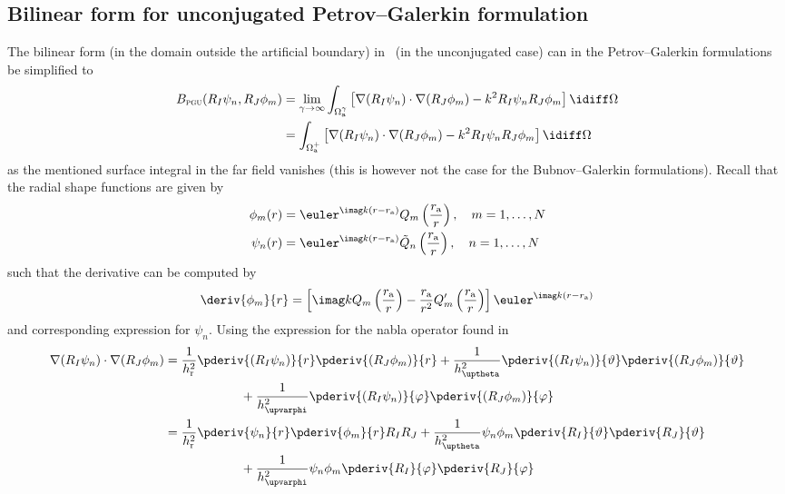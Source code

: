 \subsection{Bilinear form for unconjugated Petrov--Galerkin formulation}
The bilinear form (in the domain outside the artificial boundary) in~ (in the unconjugated case) can in the Petrov--Galerkin formulations be simplified to
\begin{align}\label{Eq2:BilinearFormInserted}
	\begin{split}
	B_{\textsc{pgu}}(R_I\psi_n,R_J\phi_m) &= \lim_{\gamma\to\infty}\int_{\Omega_{\mathrm{a}}^\gamma} \left[\nabla(R_I\psi_n)\cdot \nabla (R_J\phi_m)- k^2 R_I\psi_n R_J\phi_m\right]\idiff\Omega\\
		&=\int_{\Omega_{\mathrm{a}}^+} \left[\nabla(R_I\psi_n)\cdot \nabla (R_J\phi_m)- k^2 R_I\psi_n R_J\phi_m\right]\idiff\Omega
	\end{split}
\end{align}
as the mentioned surface integral in the far field vanishes (this is however not the case for the Bubnov--Galerkin formulations). Recall that the radial shape functions are given by
\begin{align*}
	\phi_m(r) &= \euler^{\imag k (r-r_{\mathrm{a}})}Q_m\left(\frac{r_{\mathrm{a}}}{r}\right),\quad m = 1,\dots,N\\
	\psi_n(r) &= \euler^{\imag k (r-r_{\mathrm{a}})}\tilde{Q}_n\left(\frac{r_{\mathrm{a}}}{r}\right),\quad n = 1,\dots,N
\end{align*}
such that the derivative can be computed by
\begin{equation*}
	\deriv{\phi_m}{r} = \left[\imag kQ_m\left(\frac{r_{\mathrm{a}}}{r}\right) - \frac{r_{\mathrm{a}}}{r^2}Q_m'\left(\frac{r_{\mathrm{a}}}{r}\right)\right]\euler^{\imag k (r-r_{\mathrm{a}})}
\end{equation*}
and corresponding expression for $\psi_n$. Using the expression for the nabla operator found in 
\begin{align*}
	\nabla(R_I\psi_n)\cdot \nabla (R_J\phi_m) &= \frac{1}{h_{\mathrm{r}}^2}\pderiv{(R_I\psi_n)}{r}\pderiv{(R_J\phi_m)}{r} + \frac{1}{h_{\uptheta}^2}\pderiv{(R_I\psi_n)}{\vartheta}\pderiv{(R_J\phi_m)}{\vartheta} \\
	&{\hskip6em\relax}+ \frac{1}{h_{\upvarphi}^2}\pderiv{(R_I\psi_n)}{\varphi}\pderiv{(R_J\phi_m)}{\varphi}\\
	 &= \frac{1}{h_{\mathrm{r}}^2}\pderiv{\psi_n}{r}\pderiv{\phi_m}{r}R_IR_J + \frac{1}{h_{\uptheta}^2}\psi_n\phi_m\pderiv{R_I}{\vartheta}\pderiv{R_J}{\vartheta}\\
	 &{\hskip6em\relax}+ \frac{1}{h_{\upvarphi}^2}\psi_n\phi_m\pderiv{R_I}{\varphi}\pderiv{R_J}{\varphi}
\end{align*}
